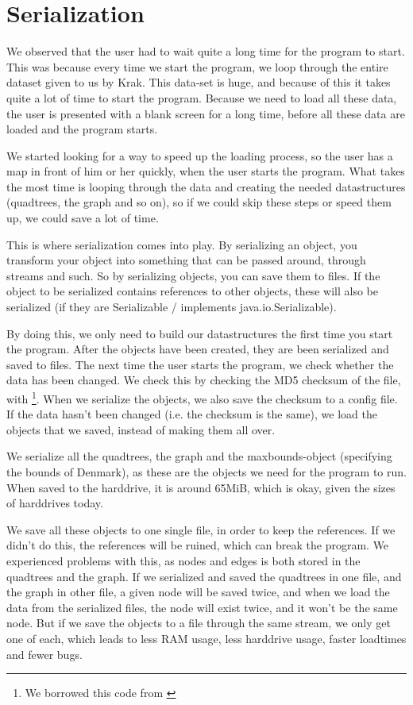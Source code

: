 \section{Serialization}
\label{IMPL-SERI}
We observed that the user had to wait quite a long time for the program to start. This
was because every time we start the program, we loop through the entire dataset given
to us by Krak. This data-set is huge, and because of this it takes quite a lot of time to
start the program. Because we need to load all these data, the user is presented with
a blank screen for a long time, before all these data are loaded and the program starts.

We started looking for a way to speed up the loading process, so the user has a map in
front of him or her quickly, when the user starts the program. What takes the most time
is looping through the data and creating the needed datastructures (quadtrees, the
graph and so on), so if we could skip these steps or speed them up, we could save a lot
of time.

This is where serialization comes into play. By serializing an object, you transform your
object into something that can be passed around, through streams and such. So by
serializing objects, you can save them to files. If the object to be serialized contains
references to other objects, these will also be serialized (if they are Serializable /
implements java.io.Serializable).

By doing this, we only need to build our datastructures the first time you start the program.
After the objects have been created, they are been serialized and saved to files. The next
time the user starts the program, we check whether the data has been changed. We check
this by checking the MD5 checksum of the file, with
\footnote{We borrowed this code from \cite{MD5}}. When we serialize 
the objects, we also save the checksum to a config file. If the data hasn't been changed 
(i.e. the checksum is the same), we load the objects that we saved, instead of making them 
all over.

We serialize all the quadtrees, the graph and the maxbounds-object (specifying the bounds
of Denmark), as these are the objects we need for the program to run. When saved to the
harddrive, it is around 65MiB, which is okay, given the sizes of harddrives today.

We save all these objects to one single file, in order to keep the references. If we didn't do
this, the references will be ruined, which can break the program. We experienced problems
with this, as nodes and edges is both stored in the quadtrees and the graph. If we serialized
and saved the quadtrees in one file, and the graph in other file, a given node will be saved
twice, and when we load the data from the serialized files, the node will exist twice, and it
won't be the same node. But if we save the objects to a file through the same stream, we only
get one of each, which leads to less RAM usage, less harddrive usage, faster loadtimes and
fewer bugs.

